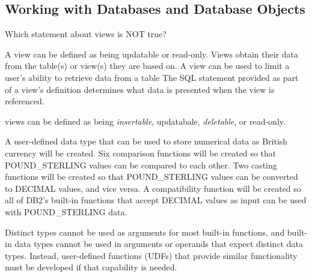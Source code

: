 \documentclass[answers, 11pt]{exam}
\begin{document}
\begin{questions}
\newpage
\section{Working with Databases and Database Objects}
\question[1]
Which statement about views is NOT true?
\begin{choices}
	\CorrectChoice A view can be defined as being updatable or read-only.
	\choice Views obtain their data from the table(s) or view(s) they are based on.
	\choice A view can be used to limit a user's ability to retrieve data from a table
	\choice The SQL statement provided as part of a view's definition determines what data is 
	presented when the view is referenced.
\end{choices}

\begin{solution}
	views can be defined as being \textit{insertable}, updatabale, \textit{deletable}, or read-only.
\end{solution}

\begin{choices}
	\choice A user-defined data type that can be used to store numerical data as British currency will be
	created.
	\choice Six comparison functions will be created so that POUND\_STERLING values can be compared to each
	other.
	\choice Two casting functions will be created so that POUND\_STERLING values can be converted to DECIMAL
	values, and vice versa.
	\CorrectChoice A compatibility function will be created so all of DB2's built-in functions that accept DECIMAL
	values as input can be used with POUND\_STERLING data.
\end{choices}

\begin{solution}
	Distinct types cannot be used as arguments for most built-in functions, and built-in data types cannot be used in arguments
	or operands that expect distinct data types. Instead, user-defined functions (UDFs) that provide similar functionality must 
	be developed if that capability is needed.
\end{solution}


\end{questions}
\end{document}
